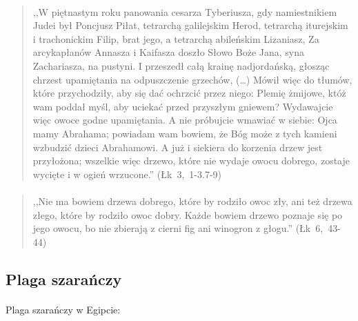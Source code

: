 \documentclass[10pt,a4paper,oneside]{article}
\begin{document}
\paragraph{}
\begin{quote}
,,W piętnastym roku panowania cesarza Tyberiusza, gdy namiestnikiem Judei był Poncjusz Piłat, tetrarchą galilejskim Herod, tetrarchą iturejskim i trachonickim Filip, brat jego, a tetrarchą abileńskim Lizaniasz, Za arcykapłanów Annasza i Kaifasza doszło Słowo Boże Jana, syna Zachariasza, na pustyni. I przeszedł całą krainę nadjordańską, głosząc chrzest upamiętania na odpuszczenie grzechów, (\ldots) Mówił więc do tłumów, które przychodziły, aby się dać ochrzcić przez niego: Plemię żmijowe, któż wam poddał myśl, aby uciekać przed przyszłym gniewem? Wydawajcie więc owoce godne upamiętania. A nie próbujcie wmawiać w siebie: Ojca mamy Abrahama; powiadam wam bowiem, że Bóg może z tych kamieni wzbudzić dzieci Abrahamowi. A już i siekiera do korzenia drzew jest przyłożona; wszelkie więc drzewo, które nie wydaje owocu dobrego, zostaje wycięte i w ogień wrzucone.'' \mbox{(Łk 3, 1-3.7-9)}
\end{quote}
\paragraph{}
\begin{quote}
,,Nie ma bowiem drzewa dobrego, które by rodziło owoc zły, ani też drzewa złego, które by rodziło owoc dobry. Każde bowiem drzewo poznaje się po jego owocu, bo nie zbierają z cierni fig ani winogron z głogu.'' \mbox{(Łk 6, 43-44)}
\end{quote}
\subsection{Plaga szarańczy}
\paragraph{}
Plaga szarańczy w Egipcie:
\end{document}
